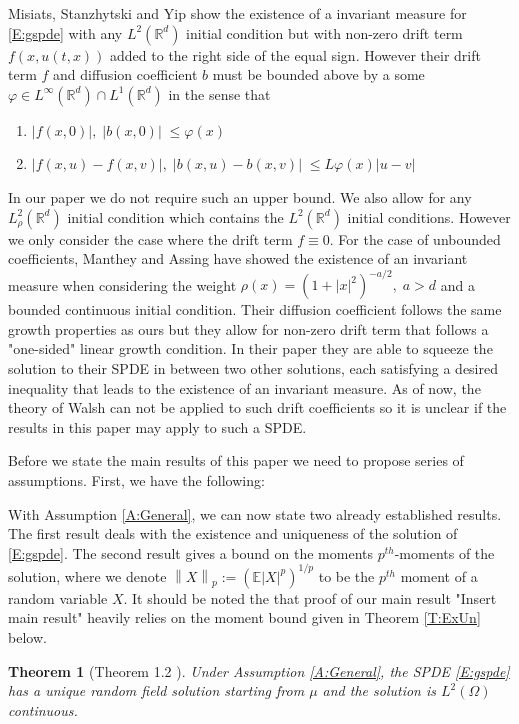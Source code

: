 \documentclass[a4paper,11pt]{article}%
\numberwithin{equation}{section}
\theoremstyle{plain}
\newtheorem{theorem}{Theorem}[section]
\theoremstyle{definition}
\newcommand{\R}{\mathbb{R}}
\newcommand{\E}{\mathbb{E}}
\newcommand{\Norm}[1]{\left\|  #1   \right\|}
\begin{document}
Misiats, Stanzhytski and Yip \cite{MSY15} show the existence of a invariant measure for \eqref{E:gspde} with any
$L^2(\R^d)$ initial condition but with non-zero drift term $f(x,u(t,x))$ added to the right side of the equal sign.
However their drift term $f$ and diffusion coefficient $b$ must be bounded above by a some $\varphi \in L^\infty(\R^d)
\cap L^1(\R^d)$ in the sense that
\begin{enumerate}
	\item $|f(x,0)|,\; |b(x,0)| \; \le \varphi(x)$
	\item $|f(x,u)-f(x,v)|, \; |b(x,u)-b(x,v)|\; \le L\varphi(x)|u-v|$
\end{enumerate}
In our paper we do not require such an upper bound. We also allow for any $L^2_\rho(\R^d)$ initial condition which
contains the $L^2(\R^d)$ initial conditions. However we only consider the case where the drift term $f \equiv 0$.  For
the case of unbounded coefficients, Manthey and Assing \cite{AM03} have showed the existence of an invariant measure
when considering the weight $\rho(x)=(1+|x|^2)^{-a/2},\; a>d$ and a bounded continuous initial condition. Their
diffusion coefficient follows the same growth properties as ours but they allow for non-zero drift term that follows a
"one-sided" linear growth condition. In their paper they are able to squeeze the solution to their SPDE in between two
other solutions, each satisfying a desired inequality that leads to the existence of an invariant measure. As of now,
the theory of Walsh can not be applied to such drift coefficients so it is unclear if the results in this paper may
apply to such a SPDE.

Before we state the main results of this paper we need to propose series of assumptions. First, we have the following:

With Assumption \ref{A:General}, we can now state two already established results. The first result deals with the existence and uniqueness of the solution of \eqref{E:gspde}. The second result gives a bound on the moments $p^{th}$-moments of the solution, where we denote $\Norm{X}_p := (\E|X|^p)^{1/p}$ to be the $p^{th}$ moment of a random variable $X$. It should be noted the that proof of our main result "Insert main result" heavily relies on the moment bound given in Theorem \ref{T:ExUn} below.

\begin{theorem}[Theorem 1.2 \cite{CH19}]
	Under Assumption \ref{A:General}, the SPDE \eqref{E:gspde} has a unique random field solution starting from $\mu$ and the solution is $L^2(\Omega)$ continuous.
\end{theorem}
\end{document}
